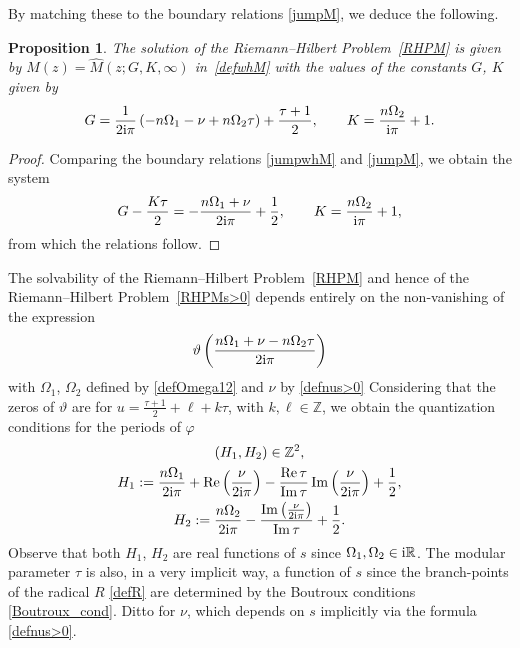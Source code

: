 \documentclass[pdftex]{sigma}
\numberwithin{equation}{section}
\newtheorem{Proposition}[Theorem]{Proposition}
\theoremstyle{definition}
\def \ds{\displaystyle}
\def\le{\left}
\def\ri{\right}
\def \wh{\widehat}
\def\nn{\nonumber}
\def\be{\begin{equation}}
\def\ee{\end{equation}}
\def\Z{{\mathbb Z}}
\def\R{{\mathbb R}}
\def \Re{\operatorname{Re} }
\def \Im {\operatorname{Im} }
\begin{document}
By matching these to the boundary relations \eqref{jumpM}, we deduce the following.

\begin{Proposition}\label{propM}
The solution of the Riemann--Hilbert Problem~{\rm\ref{RHPM}} is given by $M(z) = \wh M(z;G,K,\infty)$ in~\eqref{defwhM} with the values of the constants $G$, $K$ given by
\be
\label{defGs>0}
G= \frac {1}{2{\rm i}\pi} \le(-n\Omega_1 - \nu + n \Omega_2\tau\ri) + \frac {\tau+1}2,\qquad
K = \frac {n\Omega_2}{{\rm i}\pi} + 1.
\ee
\end{Proposition}

\begin{proof}
Comparing the boundary relations \eqref{jumpwhM} and \eqref{jumpM}, we obtain the system
\[
\ds G - \frac {K \tau}2 = - \frac{n\Omega_1+\nu}{2{\rm i}\pi} + \frac 1 2,
\qquad
\ds K = \frac{n\Omega_2}{{\rm i}\pi} +1,
\]
from which the relations follow.
\end{proof}

The solvability of the Riemann--Hilbert Problem~\ref{RHPM} and hence of the Riemann--Hilbert Problem~\ref{RHPMs>0} depends entirely on the non-vanishing of the expression
\be
\vartheta\le(\frac {n\Omega_1 + \nu - n \Omega_2\tau }{2{\rm i}\pi} \ri)
\label{674}
\ee
with $\Omega_1$, $\Omega_2$ defined by \eqref{defOmega12} and $\nu$ by \eqref{defnus>0}
Considering that the zeros of $\vartheta$ are for $u=\frac {\tau +1}2 + \ell + k\tau$, with $k,\ell\in \Z$, we obtain the quantization conditions for the periods of $\varphi$
\begin{gather}
(H_1,H_2)\in \Z^2 \nn,\\
H_1:= \frac{n\Omega_1}{2{\rm i}\pi} + \Re\le(\frac {\nu} {2{\rm i}\pi} \ri) - \frac {\Re \tau}{\Im\tau} \Im\le(\frac {\nu}{2{\rm i}\pi}\ri) + \frac 1 2,\nn
\\
H_2:= \frac{n\Omega_2}{2{\rm i}\pi} - \frac {\Im\le(\frac{\nu}{2{\rm i}\pi}\ri)}{\Im \tau} + \frac 1 2.\label{quantcond}
\end{gather}
Observe that both $H_1$, $H_2$ are real functions of $s$ since $\Omega_1,\Omega_2\in {\rm i}\R$. The modular parameter $\tau$ is also, in a very implicit way, a function of $s$ since the branch-points of the radical $R$ \eqref{defR} are determined by the Boutroux conditions \eqref{Boutroux_cond}. Ditto for $\nu$, which depends on $s$ implicitly via the formula \eqref{defnus>0}.
\end{document}

